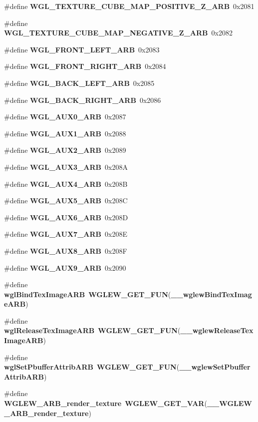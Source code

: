 \begin{DoxyCompactItemize}
\#define {\bf W\+G\+L\+\_\+\+T\+E\+X\+T\+U\+R\+E\+\_\+\+C\+U\+B\+E\+\_\+\+M\+A\+P\+\_\+\+P\+O\+S\+I\+T\+I\+V\+E\+\_\+\+Z\+\_\+\+A\+RB}~0x2081
\item 
\#define {\bf W\+G\+L\+\_\+\+T\+E\+X\+T\+U\+R\+E\+\_\+\+C\+U\+B\+E\+\_\+\+M\+A\+P\+\_\+\+N\+E\+G\+A\+T\+I\+V\+E\+\_\+\+Z\+\_\+\+A\+RB}~0x2082
\item 
\#define {\bf W\+G\+L\+\_\+\+F\+R\+O\+N\+T\+\_\+\+L\+E\+F\+T\+\_\+\+A\+RB}~0x2083
\item 
\#define {\bf W\+G\+L\+\_\+\+F\+R\+O\+N\+T\+\_\+\+R\+I\+G\+H\+T\+\_\+\+A\+RB}~0x2084
\item 
\#define {\bf W\+G\+L\+\_\+\+B\+A\+C\+K\+\_\+\+L\+E\+F\+T\+\_\+\+A\+RB}~0x2085
\item 
\#define {\bf W\+G\+L\+\_\+\+B\+A\+C\+K\+\_\+\+R\+I\+G\+H\+T\+\_\+\+A\+RB}~0x2086
\item 
\#define {\bf W\+G\+L\+\_\+\+A\+U\+X0\+\_\+\+A\+RB}~0x2087
\item 
\#define {\bf W\+G\+L\+\_\+\+A\+U\+X1\+\_\+\+A\+RB}~0x2088
\item 
\#define {\bf W\+G\+L\+\_\+\+A\+U\+X2\+\_\+\+A\+RB}~0x2089
\item 
\#define {\bf W\+G\+L\+\_\+\+A\+U\+X3\+\_\+\+A\+RB}~0x208A
\item 
\#define {\bf W\+G\+L\+\_\+\+A\+U\+X4\+\_\+\+A\+RB}~0x208B
\item 
\#define {\bf W\+G\+L\+\_\+\+A\+U\+X5\+\_\+\+A\+RB}~0x208C
\item 
\#define {\bf W\+G\+L\+\_\+\+A\+U\+X6\+\_\+\+A\+RB}~0x208D
\item 
\#define {\bf W\+G\+L\+\_\+\+A\+U\+X7\+\_\+\+A\+RB}~0x208E
\item 
\#define {\bf W\+G\+L\+\_\+\+A\+U\+X8\+\_\+\+A\+RB}~0x208F
\item 
\#define {\bf W\+G\+L\+\_\+\+A\+U\+X9\+\_\+\+A\+RB}~0x2090
\item 
\#define {\bf wgl\+Bind\+Tex\+Image\+A\+RB}~{\bf W\+G\+L\+E\+W\+\_\+\+G\+E\+T\+\_\+\+F\+UN}({\bf \+\_\+\+\_\+wglew\+Bind\+Tex\+Image\+A\+RB})
\item 
\#define {\bf wgl\+Release\+Tex\+Image\+A\+RB}~{\bf W\+G\+L\+E\+W\+\_\+\+G\+E\+T\+\_\+\+F\+UN}({\bf \+\_\+\+\_\+wglew\+Release\+Tex\+Image\+A\+RB})
\item 
\#define {\bf wgl\+Set\+Pbuffer\+Attrib\+A\+RB}~{\bf W\+G\+L\+E\+W\+\_\+\+G\+E\+T\+\_\+\+F\+UN}({\bf \+\_\+\+\_\+wglew\+Set\+Pbuffer\+Attrib\+A\+RB})
\item 
\#define {\bf W\+G\+L\+E\+W\+\_\+\+A\+R\+B\+\_\+render\+\_\+texture}~{\bf W\+G\+L\+E\+W\+\_\+\+G\+E\+T\+\_\+\+V\+AR}({\bf \+\_\+\+\_\+\+W\+G\+L\+E\+W\+\_\+\+A\+R\+B\+\_\+render\+\_\+texture})

\end{DoxyCompactItemize}
